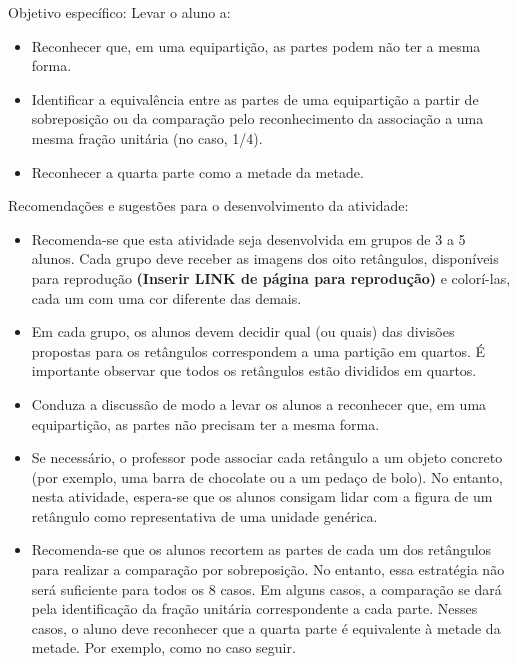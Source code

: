 \documentclass[a4paper,12pt,twoside]{book}
\begin{document}
\begin{professor*}[breakable]{}{}     
  Objetivo específico: Levar o aluno a:  
\begin{itemize} %
    \item       Reconhecer que, em uma equipartição, as partes podem não ter a mesma forma. 
    \item       Identificar a equivalência entre as partes de uma equipartição a partir de sobreposição ou da comparação pelo reconhecimento da associação a uma mesma fração unitária (no caso, 1/4).
    \item       Reconhecer a quarta parte como a metade da metade.
\end{itemize} %
  
  
  Recomendações e sugestões para o desenvolvimento da atividade:  
  
\begin{itemize} %
    \item       Recomenda-se que esta atividade seja desenvolvida em grupos de 3 a 5 alunos. Cada grupo deve receber as imagens dos oito retângulos, disponíveis para reprodução       {\bf (Inserir LINK de página para reprodução)}       e colorí-las, cada um com uma cor diferente das demais.
    \item       Em cada grupo, os alunos devem decidir qual (ou quais) das divisões propostas para os retângulos correspondem a uma partição em quartos. É importante observar que todos os retângulos estão divididos em quartos.
    \item       Conduza a discussão de modo a levar os alunos a reconhecer que, em uma equipartição, as partes não precisam ter a mesma forma.   
    \item       Se necessário, o professor pode associar cada retângulo a um objeto concreto (por exemplo, uma barra de chocolate ou a um pedaço de bolo). No entanto, nesta atividade, espera-se que os alunos consigam lidar com a figura de um retângulo como representativa de uma unidade genérica. 
    \item       Recomenda-se que os alunos recortem as partes de cada um dos retângulos para realizar a comparação por sobreposição. No entanto, essa estratégia não será suficiente para todos os 8 casos. Em alguns casos, a comparação se dará pela identificação da fração unitária correspondente a cada parte. Nesses casos, o aluno deve reconhecer que a quarta parte é equivalente à metade da metade. Por exemplo, como no caso seguir.
\end{itemize} %
  

\end{professor*}
\end{document}
